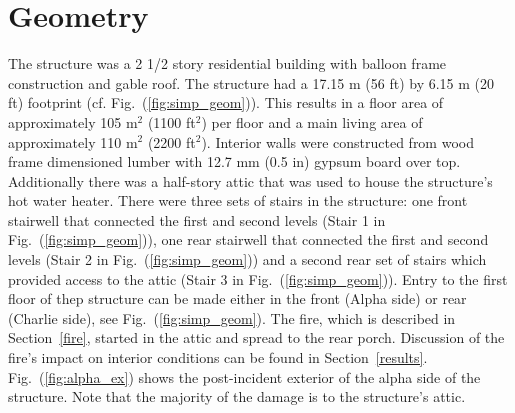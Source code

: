 \documentclass[11pt,oneside]{book}
\begin{document}
\section{Geometry}
\label{geom}
The structure was a 2 1/2 story residential building with balloon frame construction and gable roof. The structure had a 17.15 m (56 ft) by 6.15 m (20 ft) footprint (cf. Fig.~(\ref{fig:simp_geom})). This results in a floor area of approximately 105 m$^2$ (1100 ft$^2$) per floor and a main living area of approximately 110 m$^2$ (2200 ft$^2$). Interior walls were constructed from wood frame dimensioned lumber with 12.7 mm (0.5 in) gypsum board over top. Additionally there was a half-story attic that was used to house the structure's hot water heater. There were three sets of stairs in the structure: one front stairwell that connected the first and second levels (Stair 1 in Fig.~(\ref{fig:simp_geom})), one rear stairwell that connected the first and second levels (Stair 2 in Fig.~(\ref{fig:simp_geom})) and a second rear set of stairs which provided access to the attic (Stair 3 in Fig.~(\ref{fig:simp_geom})). Entry to the first floor of thep structure can be made either in the front (Alpha side) or rear (Charlie side), see Fig.~(\ref{fig:simp_geom}). The fire, which is described in Section~\ref{fire}, started in the attic and spread to the rear porch. Discussion of the fire's impact on interior conditions can be found in Section~\ref{results}. Fig.~(\ref{fig:alpha_ex}) shows the post-incident exterior of the alpha side of the structure. Note that the majority of the damage is to the structure's attic.
\end{document}
